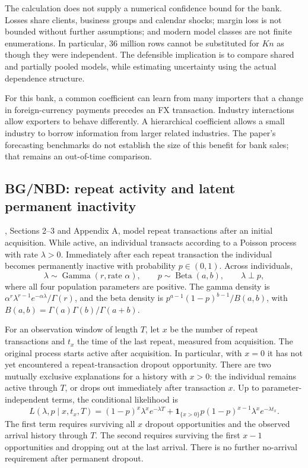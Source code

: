 The calculation does not supply a numerical confidence bound for the bank. Losses share clients, business groups and calendar shocks; margin loss is not bounded without further assumptions; and modern model classes are not finite enumerations. In particular, $36$ million rows cannot be substituted for $Kn$ as though they were independent. The defensible implication is to compare shared and partially pooled models, while estimating uncertainty using the actual dependence structure.

For this bank, a common coefficient can learn from many importers that a change in foreign-currency payments precedes an FX transaction. Industry interactions allow exporters to behave differently. A hierarchical coefficient allows a small industry to borrow information from larger related industries. The paper's forecasting benchmarks do not establish the size of this benefit for bank sales; that remains an out-of-time comparison.

\subsection{BG/NBD: repeat activity and latent permanent inactivity}

\citet{fader2005counting}, Sections 2--3 and Appendix A, model repeat transactions after an initial acquisition. While active, an individual transacts according to a Poisson process with rate $\lambda>0$. Immediately after each repeat transaction the individual becomes permanently inactive with probability $p\in(0,1)$. Across individuals,
\[
 \lambda\sim\operatorname{Gamma}(r,\text{rate }\alpha),\qquad
 p\sim\operatorname{Beta}(a,b),\qquad \lambda\perp p,
\]
where all four population parameters are positive. The gamma density is $\alpha^r\lambda^{r-1}e^{-\alpha\lambda}/\Gamma(r)$, and the beta density is $p^{a-1}(1-p)^{b-1}/B(a,b)$, with $B(a,b)=\Gamma(a)\Gamma(b)/\Gamma(a+b)$.

For an observation window of length $T$, let $x$ be the number of repeat transactions and $t_x$ the time of the last repeat, measured from acquisition. The original process starts active after acquisition. In particular, with $x=0$ it has not yet encountered a repeat-transaction dropout opportunity. There are two mutually exclusive explanations for a history with $x>0$: the individual remains active through $T$, or drops out immediately after transaction $x$. Up to parameter-independent terms, the conditional likelihood is
\begin{equation}
 L(\lambda,p\mid x,t_x,T)
 = (1-p)^x\lambda^x e^{-\lambda T}
 +\mathbf 1_{\{x>0\}}p(1-p)^{x-1}\lambda^x e^{-\lambda t_x}.
 \label{eq:bgnbd-conditional}
\end{equation}
The first term requires surviving all $x$ dropout opportunities and the observed arrival history through $T$. The second requires surviving the first $x-1$ opportunities and dropping out at the last arrival. There is no further no-arrival requirement after permanent dropout.

